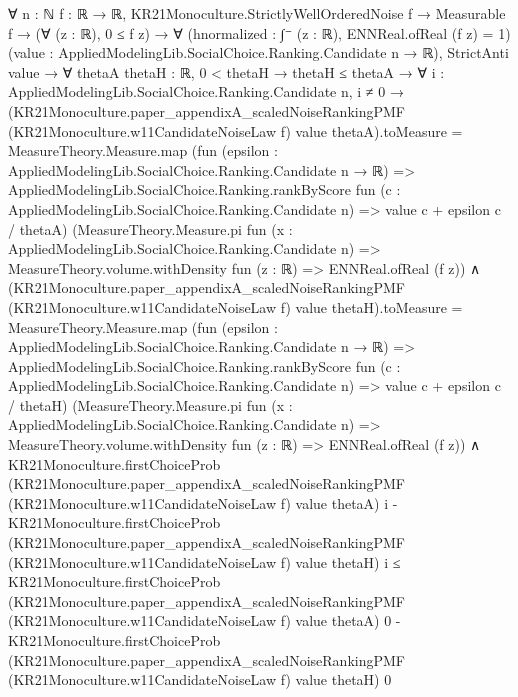 \documentclass[10pt]{article}
\begin{document}
\begin{ReviewVerbatim}
∀ {n : ℕ} {f : ℝ → ℝ},
  KR21Monoculture.StrictlyWellOrderedNoise f →
    Measurable f →
      (∀ (z : ℝ), 0 ≤ f z) →
        ∀ (hnormalized : ∫⁻ (z : ℝ), ENNReal.ofReal (f z) = 1)
          (value : AppliedModelingLib.SocialChoice.Ranking.Candidate n → ℝ),
          StrictAnti value →
            ∀ {thetaA thetaH : ℝ},
              0 < thetaH →
                thetaH ≤ thetaA →
                  ∀ {i : AppliedModelingLib.SocialChoice.Ranking.Candidate n},
                    i ≠ 0 →
                      (KR21Monoculture.paper_appendixA_scaledNoiseRankingPMF (KR21Monoculture.w11CandidateNoiseLaw f)
                              value thetaA).toMeasure =
                          MeasureTheory.Measure.map
                            (fun (epsilon : AppliedModelingLib.SocialChoice.Ranking.Candidate n → ℝ) =>
                              AppliedModelingLib.SocialChoice.Ranking.rankByScore
                                fun (c : AppliedModelingLib.SocialChoice.Ranking.Candidate n) =>
                                value c + epsilon c / thetaA)
                            (MeasureTheory.Measure.pi fun (x : AppliedModelingLib.SocialChoice.Ranking.Candidate n) =>
                              MeasureTheory.volume.withDensity fun (z : ℝ) => ENNReal.ofReal (f z)) ∧
                        (KR21Monoculture.paper_appendixA_scaledNoiseRankingPMF (KR21Monoculture.w11CandidateNoiseLaw f)
                                value thetaH).toMeasure =
                            MeasureTheory.Measure.map
                              (fun (epsilon : AppliedModelingLib.SocialChoice.Ranking.Candidate n → ℝ) =>
                                AppliedModelingLib.SocialChoice.Ranking.rankByScore
                                  fun (c : AppliedModelingLib.SocialChoice.Ranking.Candidate n) =>
                                  value c + epsilon c / thetaH)
                              (MeasureTheory.Measure.pi fun (x : AppliedModelingLib.SocialChoice.Ranking.Candidate n) =>
                                MeasureTheory.volume.withDensity fun (z : ℝ) => ENNReal.ofReal (f z)) ∧
                          KR21Monoculture.firstChoiceProb
                                (KR21Monoculture.paper_appendixA_scaledNoiseRankingPMF
                                  (KR21Monoculture.w11CandidateNoiseLaw f) value thetaA)
                                i -
                              KR21Monoculture.firstChoiceProb
                                (KR21Monoculture.paper_appendixA_scaledNoiseRankingPMF
                                  (KR21Monoculture.w11CandidateNoiseLaw f) value thetaH)
                                i ≤
                            KR21Monoculture.firstChoiceProb
                                (KR21Monoculture.paper_appendixA_scaledNoiseRankingPMF
                                  (KR21Monoculture.w11CandidateNoiseLaw f) value thetaA)
                                0 -
                              KR21Monoculture.firstChoiceProb
                                (KR21Monoculture.paper_appendixA_scaledNoiseRankingPMF
                                  (KR21Monoculture.w11CandidateNoiseLaw f) value thetaH)
                                0
\end{ReviewVerbatim}
\end{document}
